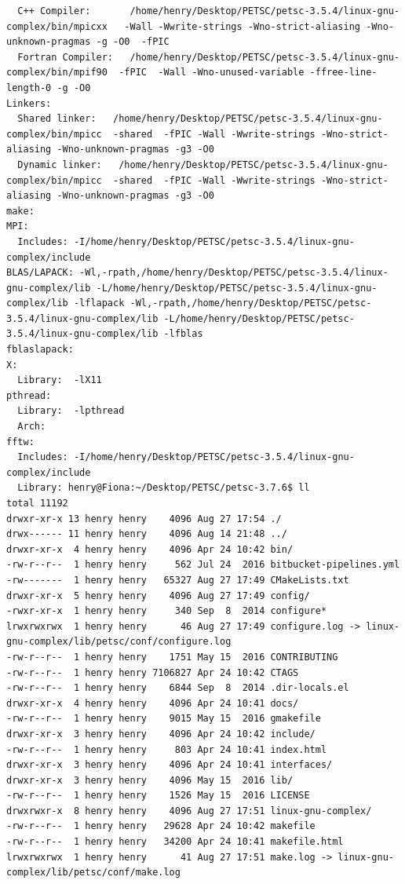 \documentclass{article}
\begin{document}
\begin{enumerate}
\begin{verbatim}
  C++ Compiler:       /home/henry/Desktop/PETSC/petsc-3.5.4/linux-gnu-complex/bin/mpicxx   -Wall -Wwrite-strings -Wno-strict-aliasing -Wno-unknown-pragmas -g -O0  -fPIC  
  Fortran Compiler:   /home/henry/Desktop/PETSC/petsc-3.5.4/linux-gnu-complex/bin/mpif90  -fPIC  -Wall -Wno-unused-variable -ffree-line-length-0 -g -O0 
Linkers:
  Shared linker:   /home/henry/Desktop/PETSC/petsc-3.5.4/linux-gnu-complex/bin/mpicc  -shared  -fPIC -Wall -Wwrite-strings -Wno-strict-aliasing -Wno-unknown-pragmas -g3 -O0
  Dynamic linker:   /home/henry/Desktop/PETSC/petsc-3.5.4/linux-gnu-complex/bin/mpicc  -shared  -fPIC -Wall -Wwrite-strings -Wno-strict-aliasing -Wno-unknown-pragmas -g3 -O0
make:
MPI:
  Includes: -I/home/henry/Desktop/PETSC/petsc-3.5.4/linux-gnu-complex/include
BLAS/LAPACK: -Wl,-rpath,/home/henry/Desktop/PETSC/petsc-3.5.4/linux-gnu-complex/lib -L/home/henry/Desktop/PETSC/petsc-3.5.4/linux-gnu-complex/lib -lflapack -Wl,-rpath,/home/henry/Desktop/PETSC/petsc-3.5.4/linux-gnu-complex/lib -L/home/henry/Desktop/PETSC/petsc-3.5.4/linux-gnu-complex/lib -lfblas
fblaslapack:
X:
  Library:  -lX11
pthread:
  Library:  -lpthread
  Arch:     
fftw:
  Includes: -I/home/henry/Desktop/PETSC/petsc-3.5.4/linux-gnu-complex/include
  Library: henry@Fiona:~/Desktop/PETSC/petsc-3.7.6$ ll
total 11192
drwxr-xr-x 13 henry henry    4096 Aug 27 17:54 ./
drwx------ 11 henry henry    4096 Aug 14 21:48 ../
drwxr-xr-x  4 henry henry    4096 Apr 24 10:42 bin/
-rw-r--r--  1 henry henry     562 Jul 24  2016 bitbucket-pipelines.yml
-rw-------  1 henry henry   65327 Aug 27 17:49 CMakeLists.txt
drwxr-xr-x  5 henry henry    4096 Aug 27 17:49 config/
-rwxr-xr-x  1 henry henry     340 Sep  8  2014 configure*
lrwxrwxrwx  1 henry henry      46 Aug 27 17:49 configure.log -> linux-gnu-complex/lib/petsc/conf/configure.log
-rw-r--r--  1 henry henry    1751 May 15  2016 CONTRIBUTING
-rw-r--r--  1 henry henry 7106827 Apr 24 10:42 CTAGS
-rw-r--r--  1 henry henry    6844 Sep  8  2014 .dir-locals.el
drwxr-xr-x  4 henry henry    4096 Apr 24 10:41 docs/
-rw-r--r--  1 henry henry    9015 May 15  2016 gmakefile
drwxr-xr-x  3 henry henry    4096 Apr 24 10:42 include/
-rw-r--r--  1 henry henry     803 Apr 24 10:41 index.html
drwxr-xr-x  3 henry henry    4096 Apr 24 10:41 interfaces/
drwxr-xr-x  3 henry henry    4096 May 15  2016 lib/
-rw-r--r--  1 henry henry    1526 May 15  2016 LICENSE
drwxrwxr-x  8 henry henry    4096 Aug 27 17:51 linux-gnu-complex/
-rw-r--r--  1 henry henry   29628 Apr 24 10:42 makefile
-rw-r--r--  1 henry henry   34200 Apr 24 10:41 makefile.html
lrwxrwxrwx  1 henry henry      41 Aug 27 17:51 make.log -> linux-gnu-complex/lib/petsc/conf/make.log

\end{verbatim}
\end{enumerate}
\end{document}
